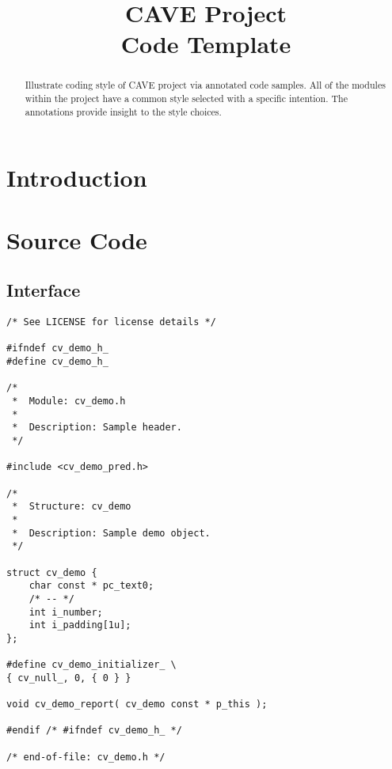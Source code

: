 \title{CAVE Project \\
Code Template}





\maketitle

\begin{abstract}

Illustrate coding style of CAVE project via annotated code samples.  All of
the modules within the project have a common style selected with a specific
intention.  The annotations provide insight to the style choices.

\end{abstract}

\tableofcontents

\lstlistoflistings

\section{Introduction}

\section{Source Code}

\subsection{Interface}

\begin{lstlisting}[caption={cv\_demo.h}]
/* See LICENSE for license details */

#ifndef cv_demo_h_
#define cv_demo_h_

/*
 *  Module: cv_demo.h
 *
 *  Description: Sample header.
 */

#include <cv_demo_pred.h>

/*
 *  Structure: cv_demo
 *
 *  Description: Sample demo object.
 */

struct cv_demo {
    char const * pc_text0;
    /* -- */
    int i_number;
    int i_padding[1u];
};

#define cv_demo_initializer_ \
{ cv_null_, 0, { 0 } }

void cv_demo_report( cv_demo const * p_this );

#endif /* #ifndef cv_demo_h_ */

/* end-of-file: cv_demo.h */
\end{lstlisting}

